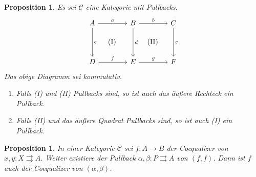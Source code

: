 \documentclass[a4paper, parskip=half]{scrartcl}
\theoremstyle{marginbreak}
\newtheorem{proposition}[remark]{Proposition}
\theoremstyle{nonumberplain}
\newtheorem{proof}{Beweis.}
\newcommand\cat\mathcal
\newcommand{\p}[1]{\iftoggle{proofs}{#1}{}}
\begin{document}
		\begin{proposition}
			Es sei $\cat{C}$ eine Kategorie mit Pullbacks.
			\[
				\begin{tikzcd}[sep=4em]
					A \ar{r}{a} \ar[phantom]{dr}{\text{(I)}} \ar{d}{c} & B \ar[phantom]{dr}{\text{(II)}} \ar{r}{b} \ar{d}{d} & C \ar{d}{e}\\
					D \ar{r}{f} & E \ar{r}{g} & F
				\end{tikzcd}
			\]
			Das obige Diagramm sei kommutativ.
			\begin{enumerate}
				\item Falls (I) und (II) Pullbacks sind, so ist auch das äußere
					Rechteck ein Pullback.
				\item Falls (II) und das äußere Quadrat Pullbacks sind, so ist auch
					(I) ein Pullback.
			\end{enumerate}
		\end{proposition}
		\p{\begin{proof}
			\begin{enumerate}
				\item Es seien $x\colon X\to D$, $y\colon X\to C$ mit $g\circ f\circ x = e\circ y$.
					Pullback (II) liefert ein eindeutiges $z\colon X\to B$, sodass
					$b\circ z = y$, $d\circ z = f\circ x$. Letztere Gleichheit und Pullback
					(I) geben ein eindeutiges $w\colon X\to A$, sodass $a\circ w = z$, $c\circ w = x$.
					Insbesondere gilt $b\circ a\circ w = b\circ z = y$. Es sei $w'\colon X\to A$ ein
					weiterer Morphismus mit $b\circ a\circ w' = y$ und $c\circ w' = x$. Es gilt also
					$b\circ (a\circ w') = y = b\circ (a\circ w)$ und
					$d\circ(a\circ w') = f\circ (c\circ w') = f\circ x = f\circ c\circ w = d\circ (a\circ w)$.
					Pullback (II) liefert $a\circ w'=a\circ w$. Weiter ist $c\circ w'= x = c\circ w$.
					Pullback (I) liefert $w=w'$.
				\item Es sei $(A', c', a')$ der Pullback von $f$ und $d$. Mit (1) und da (II) ein Pullback ist, ist $(A', c', b\circ a')$ ein Pullback von
					$(g\circ f, e)$. Es ist jedoch auch $(A, c, b\circ a)$ ein Pullback von $(g\circ f, e)$.
					Da Limiten eindeutig sind, folgt $A\cong A'$. \textcolor{red}{Reicht das? Borceux
					schreibt den Isomophismus noch hin, aber ich glaube, das hier zeigt schon die
					Behauptung.}
			\end{enumerate}
		\end{proof}}
		\begin{proposition}
			In einer Kategorie $\cat{C}$ sei $f\colon A\to B$ der Coequalizer von
			$x, y\colon X\rightrightarrows A$. Weiter existiere der Pullback
			$\alpha, \beta\colon P\rightrightarrows A$ von $(f, f)$. Dann ist
			$f$ auch der Coequalizer von $(\alpha, \beta)$.
		\end{proposition}
\end{document}
